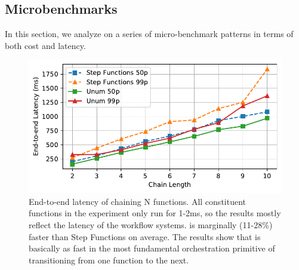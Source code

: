 

\subsection{Microbenchmarks}\label{sec:eval:micro}

In this section, we analyze \name{} on a series of micro-benchmark patterns in terms of both cost and latency. 

\begin{figure}[t!]
	\centering
	\includegraphics[width=\columnwidth]{figures/ChainMicroLatency.pdf}
	\caption{End-to-end latency of chaining N functions. All constituent
		functions in the experiment only run for 1-2ms, so the results mostly
		reflect the latency of the workflow systems. \name{} is marginally
		(11-28\%) faster than Step Functions on average. The results show that
		\name{} is basically as fast in the most fundamental orchestration
		primitive of transitioning from one function to the next.}
	\label{fig:chainmicrolatency}
\end{figure}


